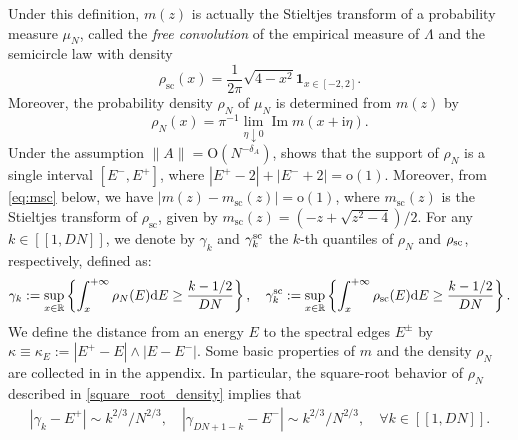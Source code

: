 \documentclass[10pt,reqno]{amsart}
\numberwithin{equation}{section}
\numberwithin{figure}{section}
\theoremstyle{plain} %
\theoremstyle{definition} %
\renewcommand{\txt}[1]{\text{\rm{#1}}}
\newcommand{\R}{\mathbb{R}}
\newcommand{\ii}{\mathrm{i}}
\renewcommand{\geq}{\ge}
\newcommand{\qq}[1]{[\![{#1}]\!]}
\newcommand{\ha}[1]{\left\{{#1}\right\}}
\newcommand{\absa}[1]{\left\lvert #1 \right\rvert}
\DeclareMathOperator{\im}{\mathrm{Im}}
\newcommand{\bu}{{\bf{u}}}
\newcommand{\be}{\begin{equation}}
\newcommand{\ee}{\end{equation}}
\newcommand{\rd}{\mathrm{d}}
\newcommand{\oo}{\mathrm{o}}
\newcommand{\OO}{\mathrm{O}}
\newcommand{\tsc}{{\mathrm{sc}}}
\numberwithin{equation}{section}
\begin{document}
Under this definition, $m(z)$ is actually the Stieltjes transform of a probability measure $\mu_{N}$, called the \emph{free convolution} of the empirical measure of $\Lambda $ and the semicircle law with density 
\be\label{eq:semidensity}\rho_{\tsc}(x)=\frac{1}{2\pi} \sqrt{4-x^2}\mathbf 1_{x\in [-2,2]}.\ee
Moreover, the probability density $\rho_{N}$ of $\mu_{N}$ is determined from $m(z)$ by \be\label{eq:density_rhoN}
\rho_{N}(x)=\pi^{-1}\lim_{\eta\downarrow 0}\im m(x+\ii \eta).
\ee
Under the assumption $\|A\|=\OO(N^{-\delta_A})$, \cite[Lemma 4.3]{lee2015edge} shows that the support of $\rho_{N}$ is a single interval $[E^-,E^+]$, where $|E^+-2|+|E^-+2|=\oo(1)$. Moreover, from \eqref{eq:msc} below, we have $|m(z)-m_{\tsc}(z)|=\oo(1)$, where $m_{\tsc}(z)$ is the Stieltjes transform of $\rho_{\tsc}$, given by
$m_{\tsc}(z)=(-z+\sqrt{z^2-4})/{2}$. 
For any $k\in\qq{1,DN}$, we denote by $\gamma_k$ and $\gamma_k^{\txt{sc}}$ the $k$-th quantiles of $\rho_N$ and $\rho_{\txt{sc}}$, respectively, defined as:
\begin{equation}\label{eq:gammak}
    \begin{aligned}
        \gamma_k:=\sup_{x\in \R}\ha{\int_{x}^{+\infty}\rho_N(E)\rd E\geq \frac{k-1/2}{DN}},\quad \gamma_k^{\txt{sc}}:=\sup_{x\in \R}\ha{\int_{x}^{+\infty}\rho_{\txt{sc}}(E)\rd E\geq \frac{k-1/2}{DN}}.
    \end{aligned}
\end{equation}
We define the distance from an energy $E$ to the spectral edges $E^\pm$ by $\kappa \equiv \kappa_E:=\absa{E^+ -E}\wedge \absa{E-E^-} $. Some basic properties of $m$ and the density $\rho_N$ are collected in  in the appendix. In particular, the square-root behavior of $\rho_N$ described in \eqref{square_root_density} implies that
\begin{equation}\label{eq:kappa_gamma_k}
    \begin{aligned}
        \absa{\gamma_k-E^+}\sim {k}^{2/3}/N^{2/3},\quad \absa{\gamma_{DN+1-k}-E^-}\sim {k}^{2/3}/N^{2/3},\quad \forall k\in\qq{1,DN}.
    \end{aligned}
\end{equation}
\end{document}
